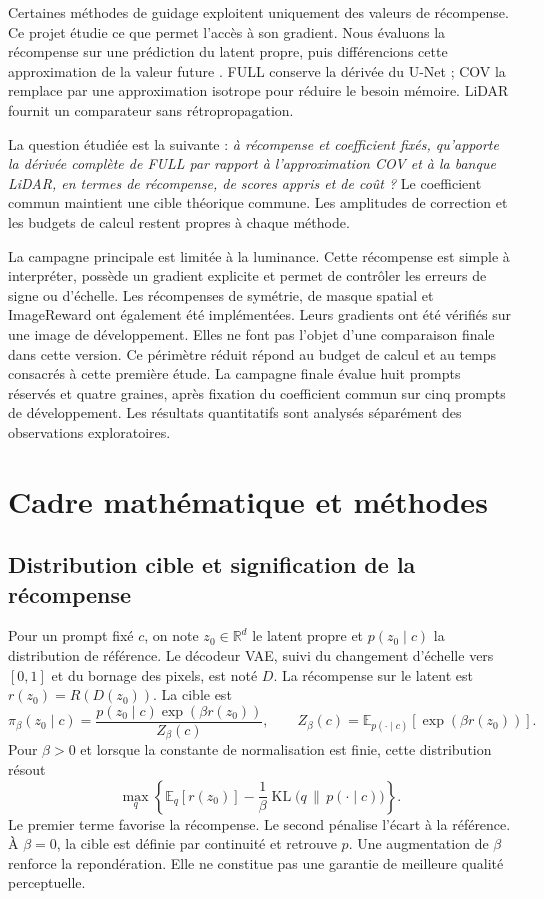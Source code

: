 \documentclass[11pt,a4paper]{article}
\newcommand{\E}{\mathbb{E}}
\newcommand{\KL}{\operatorname{KL}}
\newcommand{\R}{\mathbb{R}}
\begin{document}
Certaines méthodes de guidage exploitent uniquement des valeurs de récompense. Ce projet étudie ce que permet l'accès à son gradient. Nous évaluons la récompense sur une prédiction du latent propre, puis différencions cette approximation de la valeur future \cite{uehara,dps,universal,lidar}. FULL conserve la dérivée du U-Net ; COV la remplace par une approximation isotrope pour réduire le besoin mémoire. LiDAR fournit un comparateur sans rétropropagation.

La question étudiée est la suivante : \emph{à récompense et coefficient fixés, qu'apporte la dérivée complète de FULL par rapport à l'approximation COV et à la banque LiDAR, en termes de récompense, de scores appris et de coût ?} Le coefficient commun maintient une cible théorique commune. Les amplitudes de correction et les budgets de calcul restent propres à chaque méthode.

La campagne principale est limitée à la luminance. Cette récompense est simple à interpréter, possède un gradient explicite et permet de contrôler les erreurs de signe ou d'échelle. Les récompenses de symétrie, de masque spatial et ImageReward ont également été implémentées. Leurs gradients ont été vérifiés sur une image de développement. Elles ne font pas l'objet d'une comparaison finale dans cette version. Ce périmètre réduit répond au budget de calcul et au temps consacrés à cette première étude. La campagne finale évalue huit prompts réservés et quatre graines, après fixation du coefficient commun sur cinq prompts de développement. Les résultats quantitatifs sont analysés séparément des observations exploratoires.

\section{Cadre mathématique et méthodes}
\subsection{Distribution cible et signification de la récompense}
Pour un prompt fixé $c$, on note $z_0\in\R^d$ le latent propre et $p(z_0\mid c)$ la distribution de référence. Le décodeur VAE, suivi du changement d'échelle vers $[0,1]$ et du bornage des pixels, est noté $D$. La récompense sur le latent est $r(z_0)=R(D(z_0))$. La cible est
\begin{equation}\label{eq:target}
\pi_\beta(z_0\mid c)=\frac{p(z_0\mid c)\exp(\beta r(z_0))}{Z_\beta(c)},
\qquad Z_\beta(c)=\E_{p(\cdot\mid c)}[\exp(\beta r(z_0))].
\end{equation}
Pour $\beta>0$ et lorsque la constante de normalisation est finie, cette distribution résout
\begin{equation}\label{eq:variational}
\max_q\left\{\E_q[r(z_0)]-\frac{1}{\beta}\KL\bigl(q\,\|\,p(\cdot\mid c)\bigr)\right\}.
\end{equation}
Le premier terme favorise la récompense. Le second pénalise l'écart à la référence. À $\beta=0$, la cible est définie par continuité et retrouve $p$. Une augmentation de $\beta$ renforce la repondération. Elle ne constitue pas une garantie de meilleure qualité perceptuelle.
\end{document}
